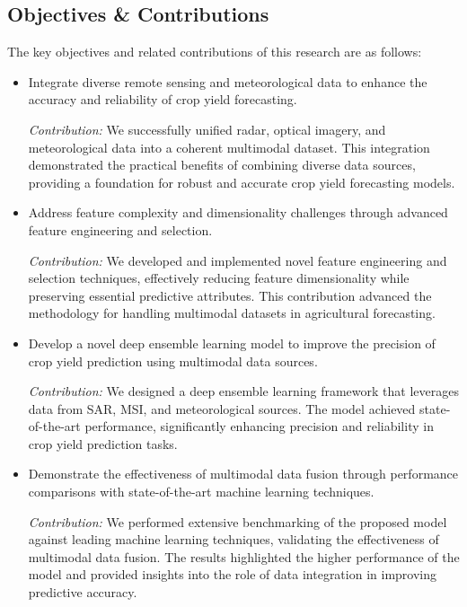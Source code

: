 \subsection{Objectives \& Contributions}
The key objectives and related contributions of this research are as follows:
\begin{itemize}
    \item Integrate diverse remote sensing and meteorological data to enhance the accuracy and reliability of crop yield forecasting.
    
    \textit{Contribution:} We successfully unified radar, optical imagery, and meteorological data into a coherent multimodal dataset. This integration demonstrated the practical benefits of combining diverse data sources, providing a foundation for robust and accurate crop yield forecasting models.
    
    \item Address feature complexity and dimensionality challenges through advanced feature engineering and selection.
    
    \textit{Contribution:} We developed and implemented novel feature engineering and selection techniques, effectively reducing feature dimensionality while preserving essential predictive attributes. This contribution advanced the methodology for handling multimodal datasets in agricultural forecasting.
    
    \item Develop a novel deep ensemble learning model to improve the precision of crop yield prediction using multimodal data sources.
    
    \textit{Contribution:} We designed a deep ensemble learning framework that leverages data from SAR, MSI, and meteorological sources. The model achieved state-of-the-art performance, significantly enhancing precision and reliability in crop yield prediction tasks.
    
    \item Demonstrate the effectiveness of multimodal data fusion through performance comparisons with state-of-the-art machine learning techniques.
    
    \textit{Contribution:} We performed extensive benchmarking of the proposed model against leading machine learning techniques, validating the effectiveness of multimodal data fusion. The results highlighted the higher performance of the model and provided insights into the role of data integration in improving predictive accuracy.
\end{itemize}